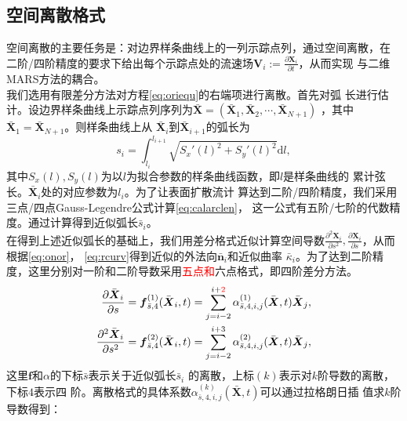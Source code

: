 \documentclass[a4paper,twoside]{ctexart}
\newcommand{\pdfrac}[2]{\frac{\partial #1}{\partial #2}}
\begin{document}
\subsection{空间离散格式}
\label{sec:discrete}
空间离散的主要任务是：对边界样条曲线上的一列示踪点列，通过空间离散，在
二阶/四阶精度的要求下给出每个示踪点处的流速场$\boldsymbol V_i := \pdfrac{\boldsymbol X_i}{t}$，从而实现
与二维MARS方法的耦合。\\
\indent 我们选用有限差分方法对方程\eqref{eq:oriequ}的右端项进行离散。首先对弧
长进行估计。设边界样条曲线上示踪点列序列为$\bar{\boldsymbol X} =
\left(\bar{\boldsymbol X}_1,\bar{\boldsymbol X}_2,\cdots,\bar{\boldsymbol X}_{N+1}\right)$
，其中$\bar{\boldsymbol X}_1 = \bar{\boldsymbol X}_{N+1}$。则样条曲线上从
$\bar{\boldsymbol X}_i$到$\bar{\boldsymbol X}_{i+1}$的弧长为
\begin{equation}
  \label{eq:calarclen}
  s_i = \int_{l_i}^{l_{i+1}}\sqrt{S_x'(l)^2 + S_y'(l)^2}\text{d}l, 
\end{equation}
其中$S_x(l),S_y(l)$为以$l$为拟合参数的样条曲线函数，即$l$是样条曲线的
累计弦长。$\bar{\boldsymbol X}_i$处的对应参数为$l_i$。为了让表面扩散流计
算达到二阶/四阶精度，我们采用三点/四点Gauss-Legendre公式计算\eqref{eq:calarclen}，
这一公式有五阶/七阶的代数精度。通过计算得到近似弧长$\bar{s}_i$。\\
\indent 在得到上述近似弧长的基础上，我们用差分格式近似计算空间导数$\frac{\partial^2\boldsymbol X_i}{\partial
    s^2},\pdfrac{\boldsymbol X_i}{s}$，从而根据\eqref{eq:onor}，
  \eqref{eq:rcurv}得到近似的外法向$\bar{\boldsymbol n}_i$和近似曲率
  $\bar{\kappa}_i$。为了达到二阶精度，这里分别对一阶和二阶导数采用\textcolor{red}{五点和}六点格式，即四阶差分方法。
  \begin{eqnarray}    
    \pdfrac{\bar{\boldsymbol X}_i}{s} =
    \boldsymbol f_{\bar{s},4}^{(1)}(\bar{\boldsymbol X}_i,t) =
    \sum_{j=i-2}^{i+\textcolor{red}{2}}\alpha_{\bar{s},4,i,j}^{(1)}(\bar{\boldsymbol X},t)
    \bar{\boldsymbol X}_j,
    \label{eq:calder1}\\
    \frac{\partial^2\bar{\boldsymbol X}_i}{\partial s^2} =
    \boldsymbol f_{\bar{s},4}^{(2)}(\bar{\boldsymbol X}_i,t) =
    \sum_{j=i-2}^{i+3}\alpha_{\bar{s},4,i,j}^{(2)}(\bar{\boldsymbol X},t)
    \bar{\boldsymbol X}_j,
    \label{eq:calder2}
  \end{eqnarray}
  这里$\boldsymbol f$和$\alpha$的下标$\bar{s}$表示关于近似弧长$\bar{s}_i$
  的离散，上标$(k)$表示对$k$阶导数的离散，下标$4$表示四
  阶。离散格式的具体系数$\alpha_{\bar{s},4,i,j}^{(k)}(\bar{\boldsymbol X},t)$可以通过拉格朗日插
  值求$k$阶导数得到：
  
\end{document}
